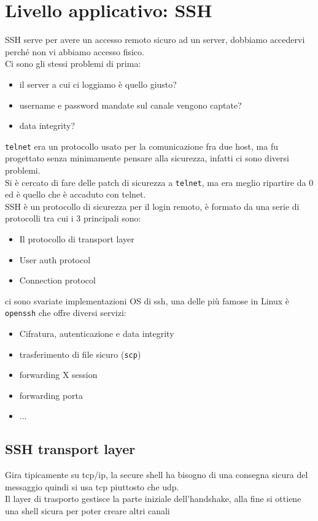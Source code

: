 \documentclass[12pt, oneside]{extbook} %
\begin{document}
\section{Livello applicativo: SSH}
SSH serve per avere un accesso remoto sicuro ad un server, dobbiamo accedervi perché non vi abbiamo accesso fisico.
\\Ci sono gli stessi problemi di prima:
\begin{itemize}
    \item il server a cui ci loggiamo è quello giusto?
    \item username e password mandate sul canale vengono captate?
    \item data integrity?
\end{itemize}
\texttt{telnet} era un protocollo usato per la comunicazione fra due host, ma fu progettato senza minimamente pensare alla sicurezza, infatti ci sono diversi problemi.
\\Si è cercato di fare delle patch di sicurezza a \texttt{telnet}, ma era meglio ripartire da 0 ed è quello che è accaduto con telnet.
\\SSH è un protocollo di sicurezza per il login remoto, è formato da una serie di protocolli tra cui i 3 principali sono:
\begin{itemize}
    \item Il protocollo di transport layer
    \item User auth protocol
    \item Connection protocol
\end{itemize}
ci sono svariate implementazioni OS di ssh, una delle più famose in Linux è \texttt{openssh} che offre diversi servizi:
\begin{itemize}
    \item Cifratura, autenticazione e data integrity
    \item trasferimento di file sicuro (\texttt{scp})
    \item forwarding X session
    \item forwarding porta
    \item ...
\end{itemize}
\subsection{SSH transport layer}
Gira tipicamente su tcp/ip, la secure shell ha bisogno di una consegna sicura del messaggio quindi si usa tcp piuttosto che udp.
\\Il layer di trasporto gestisce la parte iniziale dell'handshake, alla fine si ottiene una shell sicura per poter creare altri canali
\end{document}

